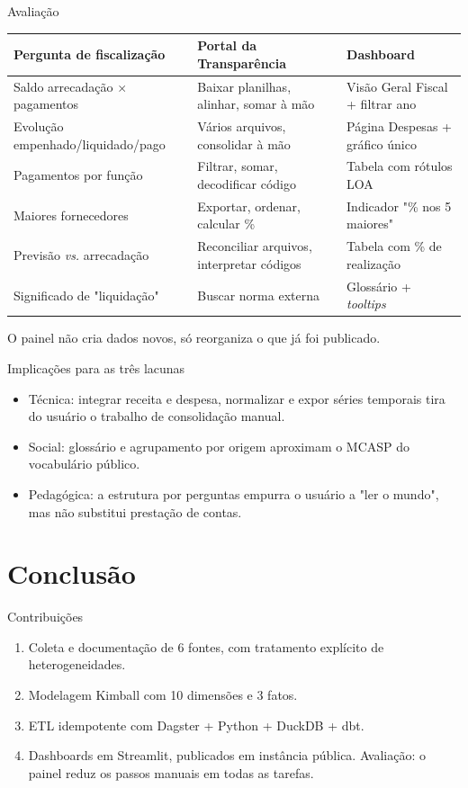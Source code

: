 \documentclass[aspectratio=169]{beamer}
\begin{document}
\begin{frame}{Avaliação}
  \scriptsize
  \begin{table}
    \centering
    \begin{tabular}{@{}p{3.9cm}p{4.3cm}p{3.6cm}@{}}
      \toprule
      \textbf{Pergunta de fiscalização} & \textbf{Portal da Transparência} & \textbf{Dashboard} \\
      \midrule
      Saldo arrecadação $\times$ pagamentos   &   Baixar planilhas, alinhar, somar à mão    &   Visão Geral Fiscal + filtrar ano \\
      Evolução empenhado/liquidado/pago   &   Vários arquivos, consolidar à mão   &   Página Despesas + gráfico único \\
      Pagamentos por função   &   Filtrar, somar, decodificar código    &   Tabela com rótulos LOA \\
      Maiores fornecedores    &   Exportar, ordenar, calcular \%  &   Indicador "\% nos 5 maiores" \\
      Previsão \textit{vs.} arrecadação   &   Reconciliar arquivos, interpretar códigos   &   Tabela com \% de realização \\
      Significado de "liquidação"   &   Buscar norma externa    &   Glossário + \textit{tooltips} \\
      \bottomrule
    \end{tabular}
  \end{table}
  \footnotesize O painel não cria dados novos, só reorganiza o que já foi publicado.
\end{frame}

\begin{frame}{Implicações para as três lacunas}
  \begin{itemize}
    \item Técnica: integrar receita e despesa, normalizar e expor séries temporais tira do usuário o trabalho de consolidação manual.
    \item Social: glossário e agrupamento por origem aproximam o MCASP do vocabulário público.
    \item Pedagógica: a estrutura por perguntas empurra o usuário a "ler o mundo", mas não substitui prestação de contas.
  \end{itemize}
\end{frame}

\section{Conclusão}
\begin{frame}{Contribuições}
  \begin{enumerate}\small
    \item Coleta e documentação de 6 fontes, com tratamento explícito de heterogeneidades.
    \item Modelagem Kimball com 10 dimensões e 3 fatos.
    \item ETL idempotente com Dagster + Python + DuckDB + dbt.
    \item Dashboards em Streamlit, publicados em instância pública. Avaliação: o painel reduz os passos manuais em todas as tarefas.
  \end{enumerate}
\end{frame}
\end{document}
